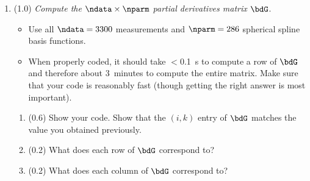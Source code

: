 \documentclass[11pt,titlepage,fleqn]{article}
\begin{document}
\begin{enumerate}
\begin{itemize}
\item Use spherical spline basis functions of order $q=8$; the center-points are in the data file \verb+con_lonlat_q08.dat+.

\end{itemize}

\begin{enumerate}
\item (0.2) What are the units for $\delta d_i$, $\delta m_k$, and $\dG_{ik}$?

\item (1.8) Calculate $\dG_{ik}$ with $i=126$ and $k=204$, and check that it is $-10.3747$. \\ Show your code for calculating $\dG_{ik}$ and also your numerical output value.

Note: Based on the indexing above, the $i=126$ measurement corresponds to the ray path between the \verb+isrc=1+ source and the \verb+irec=126+ receiver.

Note: Python is 0-indexed, so the $i$th row in the $\bG$ array will be accessed using $i-1$, and the $k$th column in the $\bdG$ array will be accessed using $k-1$.

\end{enumerate}


\item (1.0) {\em Compute the $\ndata \times \nparm$ partial derivatives matrix $\bdG$}.

\begin{itemize}
\item Use all $\ndata=3300$ measurements and $\nparm=286$ spherical spline basis functions.

\item When properly coded, it should take $<$0.1~s to compute a row of $\bdG$ and therefore about 3~minutes to compute the entire matrix. Make sure that your code is reasonably fast (though getting the right answer is most important).
\end{itemize}

\begin{enumerate}
\item (0.6) Show your code. Show that the $(i,k)$ entry of $\bdG$ matches the value you obtained previously.

\item (0.2) What does each row of $\bdG$ correspond to?

\item (0.2) What does each column of $\bdG$ correspond to?
\end{enumerate}


\end{enumerate}
\end{document}
